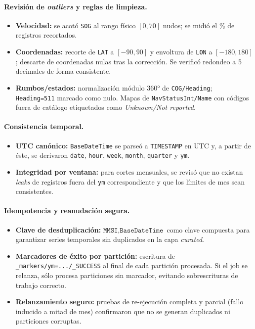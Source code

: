 \documentclass[10pt]{article}
\begin{document}
\paragraph{Revisión de \textit{outliers} y reglas de limpieza.}
\begin{itemize}
  \item \textbf{Velocidad:} se acotó \texttt{SOG} al rango físico \([0,70]\) nudos; se midió el \% de registros recortados.
  \item \textbf{Coordenadas:} recorte de \texttt{LAT} a \([-90,90]\) y envoltura de \texttt{LON} a \([-180,180]\); descarte de coordenadas nulas tras la corrección. Se verificó redondeo a 5 decimales de forma consistente.
  \item \textbf{Rumbos/estados:} normalización módulo 360° de \texttt{COG/Heading}; \texttt{Heading=511} marcado como nulo. Mapas de \texttt{NavStatusInt/Name} con códigos fuera de catálogo etiquetados como \emph{Unknown/Not reported}.
\end{itemize}

\paragraph{Consistencia temporal.}
\begin{itemize}
  \item \textbf{UTC canónico:} \texttt{BaseDateTime} se parseó a \texttt{TIMESTAMP} en UTC y, a partir de éste, se derivaron \texttt{date}, \texttt{hour}, \texttt{week}, \texttt{month}, \texttt{quarter} y \texttt{ym}.
  \item \textbf{Integridad por ventana:} para cortes mensuales, se revisó que no existan \emph{leaks} de registros fuera del \texttt{ym} correspondiente y que los límites de mes sean consistentes.
\end{itemize}

\paragraph{Idempotencia y reanudación segura.}
\begin{itemize}
  \item \textbf{Clave de desduplicación:} \(\texttt{MMSI},\texttt{BaseDateTime}\) como clave compuesta para garantizar series temporales sin duplicados en la capa \textit{curated}.
  \item \textbf{Marcadores de éxito por partición:} escritura de \texttt{\_markers/ym=.../\_SUCCESS} al final de cada partición procesada. Si el job se relanza, sólo procesa particiones sin marcador, evitando sobrescrituras de trabajo correcto.
  \item \textbf{Relanzamiento seguro:} pruebas de re-ejecución completa y parcial (fallo inducido a mitad de mes) confirmaron que no se generan duplicados ni particiones corruptas.
\end{itemize}
\end{document}
